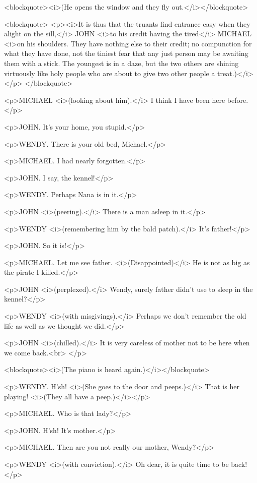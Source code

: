 <blockquote><i>(He opens the window and they fly
out.</i></blockquote>

<blockquote>
<p><i>It is thus that the truants find entrance easy when they alight
on the sill,</i> JOHN <i>to his credit having the tired</i> MICHAEL
<i>on his shoulders. They have nothing else to their credit; no
compunction for what they have done, not the tiniest fear that any
just person may be awaiting them with a stick. The youngest is in a
daze, but the two others are shining virtuously like holy people who
are about to give two other people a treat.)</i></p>
</blockquote>

<p>MICHAEL <i>(looking about him).</i> I think I have been here
before.</p>

<p>JOHN. It's your home, you stupid.</p>

<p>WENDY. There is your old bed, Michael.</p>

<p>MICHAEL. I had nearly forgotten.</p>

<p>JOHN. I say, the kennel!</p>

<p>WENDY. Perhaps Nana is in it.</p>

<p>JOHN <i>(peering).</i> There is a man asleep in it.</p>

<p>WENDY <i>(remembering him by the bald patch).</i> It's father!</p>

<p>JOHN. So it is!</p>

<p>MICHAEL. Let me see father. <i>(Disappointed)</i> He is not as big
as the pirate I killed.</p>

<p>JOHN <i>(perplexed).</i> Wendy, surely father didn't use to sleep
in the kennel?</p>

<p>WENDY <i>(with misgivings).</i> Perhaps we don't remember the old
life as well as we thought we did.</p>

<p>JOHN <i>(chilled).</i> It is very careless of mother not to be
here when we come back.<br>
</p>

<blockquote><i>(The piano is heard again.)</i></blockquote>

<p>WENDY. H'sh! <i>(She goes to the door and peeps.)</i> That is her
playing! <i>(They all have a peep.)</i></p>

<p>MICHAEL. Who is that lady?</p>

<p>JOHN. H'sh! It's mother.</p>

<p>MICHAEL. Then are you not really our mother, Wendy?</p>

<p>WENDY <i>(with conviction).</i> Oh dear, it is quite time to be
back!</p>

